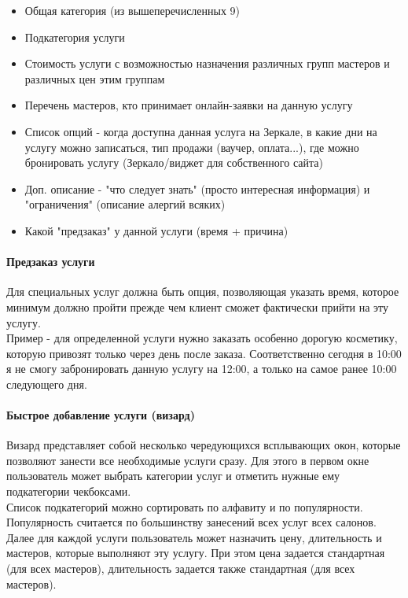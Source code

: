 \documentclass[DIV=calc, paper=a4, fontsize=11pt]{scrartcl} %
\begin{document}
\begin{itemize}
	\item Общая категория (из вышеперечисленных 9)
	\item Подкатегория услуги
	\item Стоимость услуги с возможностью назначения различных групп мастеров и различных цен этим группам
	\item Перечень мастеров, кто принимает онлайн-заявки на данную услугу
	\item Список опций - когда доступна данная услуга на Зеркале, в какие дни на услугу можно записаться, тип продажи (ваучер, оплата...), где можно бронировать услугу (Зеркало/виджет для собственного сайта)
	\item Доп. описание - "что следует знать" (просто интересная информация) и "ограничения" (описание алергий всяких)
	\item Какой "предзаказ" у данной услуги (время + причина)
\end{itemize}

\paragraph{Предзаказ услуги}

Для специальных услуг должна быть опция, позволяющая указать время, которое минимум должно пройти прежде чем клиент сможет фактически прийти на эту услугу. 
\\[0.5cm]
Пример - для определенной услуги нужно заказать особенно дорогую косметику, которую привозят только через день после заказа. Соответственно сегодня в 10:00 я не смогу забронировать данную услугу на 12:00, а только на самое ранее 10:00 следующего дня.

\paragraph{Быстрое добавление услуги (визард)} \label{paragraph:appointment_wizard}
Визард представляет собой несколько чередующихся всплывающих окон, которые позволяют занести все необходимые услуги сразу. Для этого в первом окне пользователь может выбрать категории услуг и отметить нужные ему подкатегории чекбоксами.
\\[0.5cm]
Список подкатегорий можно сортировать по алфавиту и по популярности. Популярность считается по большинству занесений всех услуг всех салонов.
\\[0.5cm]
Далее для каждой услуги пользователь может назначить цену, длительность и мастеров, которые выполняют эту услугу. При этом цена задается стандартная (для всех мастеров), длительность задается также стандартная (для всех мастеров).
\end{document}
